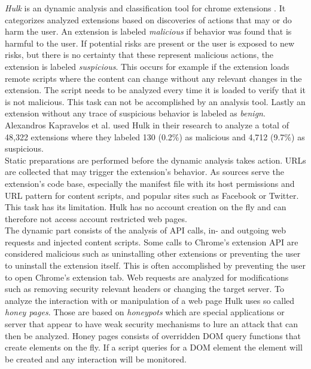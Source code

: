 	\textit{Hulk} is an dynamic analysis and classification tool for chrome extensions \cite{184485}. It categorizes analyzed extensions based on discoveries of actions that may or do harm the user. An extension is labeled \textit{malicious} if behavior was found that is harmful to the user. If potential risks are present or the user is exposed to new risks, but there is no certainty that these represent malicious actions, the extension is labeled \textit{suspicious}. This occurs for example if the extension loads remote scripts where the content can change without any relevant changes in the extension. The script needs to be analyzed every time it is loaded to verify that it is not malicious. This task can not be accomplished by an analysis tool. Lastly an extension without any trace of suspicious behavior is labeled as \textit{benign}. Alexandros Kapravelos et al. used Hulk in their research to analyze a total of 48,322 extensions where they labeled 130 (0.2\%) as malicious and 4,712 (9.7\%) as suspicious. \\
	Static preparations are performed before the dynamic analysis takes action. URLs are collected that may trigger the extension's behavior. As sources serve the extension's code base, especially the manifest file with its host permissions and URL pattern for content scripts, and popular sites such as Facebook or Twitter. This task has its limitation. Hulk has no account creation on the fly and can therefore not access account restricted web pages. \\
	The dynamic part consists of the analysis of API calls, in- and outgoing web requests and injected content scripts. Some calls to Chrome's extension API are considered malicious such as uninstalling other extensions or preventing the user to uninstall the extension itself. This is often accomplished by preventing the user to open Chrome's extension tab. Web requests are analyzed for modifications such as removing security relevant headers or changing the target server. To analyze the interaction with or manipulation of a web page Hulk uses so called \textit{honey pages}. Those are based on \textit{honeypots} which are special applications or server that appear to have weak security mechanisms to lure an attack that can then be analyzed. Honey pages consists of overridden DOM query functions that create elements on the fly. If a script queries for a DOM element the element will be created and any interaction will be monitored. \\
	
